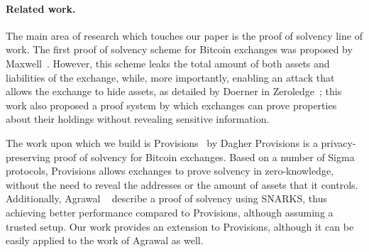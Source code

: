 \paragraph{Related work.}\label{sec:related}

The main area of research which touches our paper is the proof of solvency line
of work. The first proof of solvency scheme for Bitcoin exchanges was proposed
by Maxwell~\cite{wilcox2014proving}. However, this scheme leaks the total
amount of both assets and liabilities of the exchange, while, more importantly,
enabling an attack that allows the exchange to hide assets, as detailed by
Doerner \etal in Zeroledge~\cite{doernerzeroledge}; this work also proposed a
proof system by which exchanges can prove properties about their holdings
without revealing sensitive information.

The work upon which we build is Provisions~\cite{CCS:DBBCB15} by Dagher \etal
Provisions is a privacy-preserving proof of solvency for Bitcoin exchanges.
Based on a number of Sigma protocols, Provisions allows exchanges to prove
solvency in zero-knowledge, \ie without the need to reveal the addresses or the
amount of assets that it controls. Additionally, Agrawal
\etal~\cite{C:AgrGanMoh18} describe a proof of solvency using SNARKS, thus
achieving better performance compared to Provisions, although assuming a
trusted setup. Our work provides an extension to Provisions, although it can be
easily applied to the work of Agrawal \etal as well.

